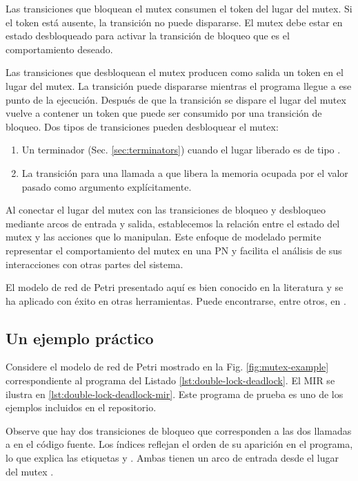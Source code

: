 Las transiciones que bloquean el mutex consumen el token del lugar del mutex. Si el token
está ausente, la transición no puede dispararse. El mutex debe estar en estado desbloqueado
para activar la transición de bloqueo que es el comportamiento deseado.

Las transiciones que desbloquean el mutex producen como salida un token en el lugar del mutex. La
transición puede dispararse mientras el programa llegue a ese punto de la ejecución. Después
de que la transición se dispare el lugar del mutex vuelve a contener un token que puede ser
consumido por una transición de bloqueo. Dos tipos de transiciones pueden desbloquear el
mutex:

\begin{enumerate}
      \item Un terminador  (Sec. \ref{sec:terminators})
            cuando el lugar liberado es de tipo .
      \item La transición para una llamada a  que libera la memoria ocupada por el
            valor pasado como argumento explícitamente.
\end{enumerate}

Al conectar el lugar del mutex con las transiciones de bloqueo y desbloqueo mediante arcos de
entrada y salida, establecemos la relación entre el estado del mutex y las acciones que lo
manipulan. Este enfoque de modelado permite representar el comportamiento del mutex en una
\acrshort{PN} y facilita el análisis de sus interacciones con otras partes del sistema.

El modelo de red de Petri presentado aquí es bien conocido en la literatura y se ha aplicado con éxito en
otras herramientas. Puede encontrarse, entre otros, en \cite{kavi2002modeling,moshtaghi2001,meyer2020,zhang2022deadlocks}.

\subsection{Un ejemplo práctico}

Considere el modelo de red de Petri mostrado en la Fig. \ref{fig:mutex-example}
correspondiente al programa del Listado \ref{lst:double-lock-deadlock}.
El \acrshort{MIR} se ilustra en \ref{lst:double-lock-deadlock-mir}.
Este programa de prueba es uno de los ejemplos incluidos en el repositorio.

Observe que hay dos transiciones de bloqueo que corresponden a las dos llamadas a  en
el código fuente. Los índices reflejan el orden de su aparición en el programa, lo
que explica las etiquetas  y .
Ambas tienen un arco de entrada desde el lugar del mutex .

